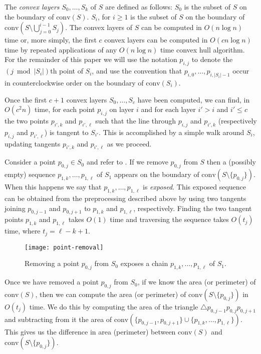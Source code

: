 \documentclass{elsart}
\newcommand{\ch}{\mathrm{conv}}
\begin{document}
The \emph{convex layers} $S_0,\ldots,S_k$ of $S$ are defined as
follows: $S_0$ is the subset of $S$ on the boundary of $\ch(S)$.
$S_i$, for $i\ge 1$ is the subset of $S$ on the boundary of
$\ch(S\setminus\bigcup_{j=0}^{i-1} S_j)$.  The convex layers of $S$
can be computed in $O(n\log n)$ time \cite{c85,hs92} or, more simply,
the first $c$ convex layers can be computed in $O(cn\log n)$ time by
repeated applications of any $O(n\log n)$ time convex hull algorithm.
For the remainder of this paper we will use the notation $p_{i,j}$ to
denote the $(j\bmod |S_i|)$th point of $S_i$, and use the convention
that $p_{i,0},\ldots,p_{i,|S_i|-1}$ occur in counterclockwise order on
the boundary of $\ch(S_i)$.

Once the first $c+1$ convex layers $S_0,\ldots,S_c$ have been
computed, we can find, in $O(c^2 n)$ time, for each point $p_{i,j}$ on
layer $i$ and for each layer $i'> i$ and $i'\le c$ the two points
$p_{i',k}$ and $p_{i',\ell}$ such that the line through $p_{i,j}$ and
$p_{i',k}$ (respectively $p_{i,j}$ and $p_{i',\ell}$) is tangent to
$S_{i'}$.  This is accomplished by a simple walk around $S_i$,
updating tangents $p_{i',k}$ and $p_{i',\ell}$ as we proceed.

Consider a point $p_{0,j}\in S_0$ and refer to .
If we remove $p_{0,j}$ from $S$ then a (possibly empty) sequence
$p_{1,k},\ldots,p_{1,\ell}$ of $S_1$ appears on the boundary of
$\ch(S\setminus\{p_{0,j}\})$.  When this happens we say that
$p_{1,k},\ldots,p_{1,\ell}$ is \emph{exposed}.  This exposed sequence
can be obtained from the preprocessing described above by using two
tangents joining $p_{0,j-1}$ and $p_{0,j+1}$ to $p_{1,k}$ and
$p_{1,\ell}$, respectively.  Finding the two tangent points $p_{1,k}$
and $p_{1,\ell}$ takes $O(1)$ time and traversing the sequence takes
$O(t_j)$ time, where $t_j=\ell-k+1$.

\begin{figure}
\begin{center}\texttt{[image: point-removal]}\end{center}
\caption{Removing a point $p_{0,j}$ from $S_0$ exposes a chain
$p_{1,k},\ldots,p_{1,\ell}$ of $S_1$.}
\end{figure}

Once we have removed a point $p_{0,j}$ from $S_0$, if we know the area
(or perimeter) of $\ch(S)$, then we can compute the area (or
perimeter) of $\ch(S\setminus\{p_{0,j}\})$ in $O(t_j)$ time.  We do
this by computing the area of the triangle $\triangle
p_{0,j-1}p_{0,j}p_{0,j+1}$ and subtracting from it the area of
$\ch(\{p_{0,j-1},p_{0,j+1}\}\cup\{p_{1,k},\ldots,p_{1,\ell}\})$.  This
gives us the difference in area (perimeter) between $\ch(S)$ and
$\ch(S\setminus\{p_{0,j}\})$.
\end{document}
